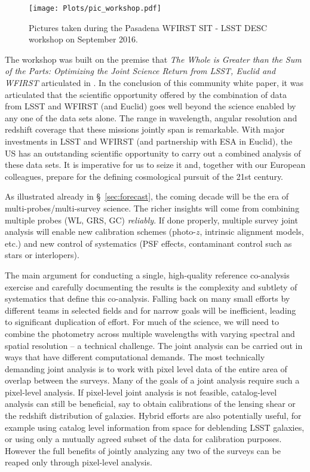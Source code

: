 \begin{figure}
\texttt{[image: Plots/pic\_workshop.pdf]}
\caption{\label{fig:pic_workshop}Pictures taken during the Pasadena WFIRST SIT - LSST DESC workshop on September 2016.}
\end{figure}

The workshop was built on the premise that \emph{The Whole is Greater than the
Sum of the Parts: Optimizing the Joint Science Return from LSST, Euclid and
WFIRST} articulated in \citet{Jain:2015cpa}. In the conclusion of this community
white paper, it was articulated that the scientific opportunity offered by the
combination of data from LSST and WFIRST (and Euclid) goes well beyond the
science enabled by any one of the data sets alone. The range in wavelength,
angular resolution and redshift coverage that these missions jointly span is
remarkable. With major investments in LSST and WFIRST (and partnership with ESA
in Euclid), the US has an outstanding scientific opportunity to carry out a
combined analysis of these data sets. It is imperative for us to seize it and,
together with our European colleagues, prepare for the defining cosmological
pursuit of the 21st century.

As illustrated already in \S~\ref{sec:forecast}, the coming decade will be the era of multi-probes/multi-survey science. The richer insights will come from combining multiple probes (WL, GRS, GC) \emph{reliably}. If done properly, multiple survey joint analysis will enable new calibration schemes (photo-$z$, intrinsic alignment models, etc.) and new control of systematics (PSF effects, contaminant control such as stars or interlopers).

The main argument for conducting a single, high-quality reference co-analysis exercise and carefully documenting the results is the complexity and subtlety of systematics that define this co-analysis. Falling back on many small efforts by different teams in selected fields and for narrow goals will be inefficient, leading to significant duplication of effort.  For much of the science, we will need to combine the photometry across multiple wavelengths with varying spectral and spatial resolution – a technical challenge. The joint analysis can be carried out in ways that have different computational demands. The most technically demanding joint analysis is to work with pixel level data of the entire area of overlap between the surveys. Many of the goals of a joint analysis require such a pixel-level analysis. If pixel-level joint analysis is not feasible, catalog-level analysis can still be beneficial, say to obtain calibrations of the lensing shear or the redshift distribution of galaxies. Hybrid efforts are also potentially useful, for example using catalog level information from space for deblending LSST galaxies, or using only a mutually agreed subset of the data for calibration purposes. However the full benefits of jointly analyzing any two of the surveys can be reaped only through pixel-level analysis.

